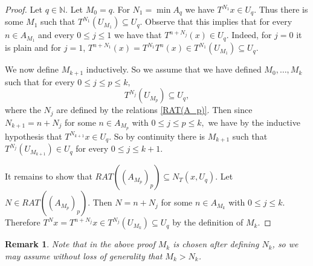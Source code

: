 \documentclass[11pt]{amsart}
\newtheorem{remark}[theorem]{Remark}
\newcommand{\zN}{\mathbb N}
\newcommand{\sub}{\subseteq}
\begin{document}
\begin{proof}
Let $q\in \zN$. Let $M_0=q$. For $N_1=\min A_q$ we have $T^{N_1}x\in U_q$. Thus there is some $M_1$ such that $T^{N_1}(U_{M_1})\sub U_q$. Observe that this implies that for every $n\in A_{M_1}$ and every $0\leq j\leq 1$ we have that $T^{n+N_j}(x)\in U_q$. Indeed, for $j=0$ it is plain and for $j=1$, $T^{n+N_1}(x)=T^{N_1} T^n(x)\in T^{N_1}(U_{M_1})\subseteq U_q.$ 

We now define $M_{k+1}$ inductively. So we assume that we have defined $M_0,\dots,M_k$ such that for every $0\le j\le p\le k,$
$$
T^{N_j}(U_{M_p})\sub U_q,
$$
where the $N_j$ are defined by the relations \eqref{RAT(A_p)}.
Then since $N_{k+1}=n+N_j$ for some $n\in A_{M_p}$ with $0\le j\le p\le k,$ we have by the inductive hypothesis that $T^{N_{k+1}}x\in U_q$. So by continuity there is $M_{k+1}$ such that $T^{N_{j}}(U_{M_{k+1}})\in U_q$ for every $0\le j\le k+1$. 

It remains to show that $RAT((A_{M_p})_p)\subseteq N_T(x,U_q)$. Let $N\in RAT((A_{M_p})_p)$. Then  $N=n+N_j$ for some $n\in A_{M_k}$ with $0\le j\le k.$ Therefore $T^Nx=T^{n+N_j}x\in T^{N_j}(U_{M_k})\sub U_q $ by the definition of $M_k$.
\end{proof}
\begin{remark}\label{rem:M_k>N_k}
    Note that in the above proof $M_k$ is chosen after defining $N_k$, so we may assume without loss of generality that $M_k>N_k$.
\end{remark}
\end{document}
